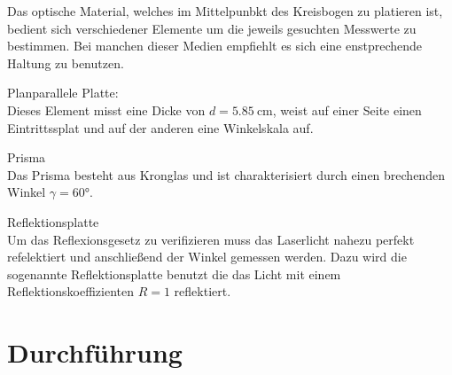 Das optische Material, welches im Mittelpunbkt des Kreisbogen zu platieren ist, bedient sich verschiedener Elemente um 
die jeweils gesuchten Messwerte zu bestimmen. Bei manchen dieser Medien empfiehlt es sich eine enstprechende Haltung zu benutzen.
\begin{description}
    \item Planparallele Platte: \\
    Dieses Element misst eine Dicke von $d = \SI{5.85}{\cm}$, weist auf einer Seite einen Eintrittssplat und auf der anderen 
    eine Winkelskala auf.
    \item Prisma \\
    Das Prisma besteht aus Kronglas und ist charakterisiert durch einen brechenden Winkel $\gamma = 60 \si{\degree}$.
    \item Reflektionsplatte \\
    Um das Reflexionsgesetz zu verifizieren muss das Laserlicht nahezu perfekt refelektiert und anschließend der Winkel
    gemessen werden. Dazu wird die sogenannte Reflektionsplatte benutzt die das Licht mit einem Reflektionskoeffizienten $R= 1$
    reflektiert.
\end{description}



\section{Durchführung}








